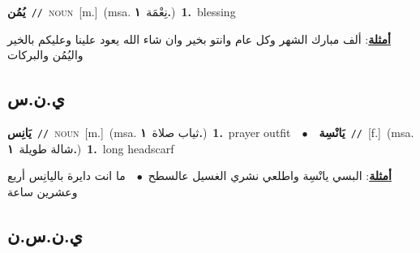 \documentclass[10pt,a4paper,twoside]{article} %
\begin{document}
\begin{multicols}{2}
{\setlength\topsep{0pt}\textbf{\foreignlanguage{arabic}{يُمُن}}\ {\color{gray}\texttt{//}\color{black}}\ \textsc{noun}\ [m.]\ \color{gray}(msa. \foreignlanguage{arabic}{نِعْمَة}~\foreignlanguage{arabic}{\textbf{١.}})\color{black}\ \textbf{1.}~blessing\  \begin{flushright}\color{gray}\foreignlanguage{arabic}{\textbf{\underline{\foreignlanguage{arabic}{أمثلة}}}: ألف مبارك الشهر وكل عام وانتو بخير وان شاء الله يعود علينا وعليكم بالخير واليُمُن والبركات}\end{flushright}\color{black}} \vspace{2mm}

\vspace{-3mm}
\subsection*{\color{blue}\foreignlanguage{arabic}{ي.ن.س}\color{blue}{ (ntws)}} 

{\setlength\topsep{0pt}\textbf{\foreignlanguage{arabic}{يَانِس}}\ {\color{gray}\texttt{//}\color{black}}\ \textsc{noun}\ [m.]\ \color{gray}(msa. \foreignlanguage{arabic}{ثياب صلاة}~\foreignlanguage{arabic}{\textbf{١.}})\color{black}\ \textbf{1.}~prayer outfit\ \ $\bullet$\ \ \setlength\topsep{0pt}\textbf{\foreignlanguage{arabic}{يَانْسِة}}\ {\color{gray}\texttt{//}\color{black}}\ [f.]\ \color{gray}(msa. \foreignlanguage{arabic}{شالة طويلة}~\foreignlanguage{arabic}{\textbf{١.}})\color{black}\ \textbf{1.}~long headscarf\  \begin{flushright}\color{gray}\foreignlanguage{arabic}{\textbf{\underline{\foreignlanguage{arabic}{أمثلة}}}: البسي يانْسِة واطلعي نشري الغسيل عالسطح\ $\bullet$\ \  ما انت دايرة باليانِس أربع وعشرين ساعة}\end{flushright}\color{black}} \vspace{2mm}

\vspace{-3mm}
\subsection*{\color{blue}\foreignlanguage{arabic}{ي.ن.س.ن}\color{blue}{ (ntws)}} 


\end{multicols}
\end{document}
